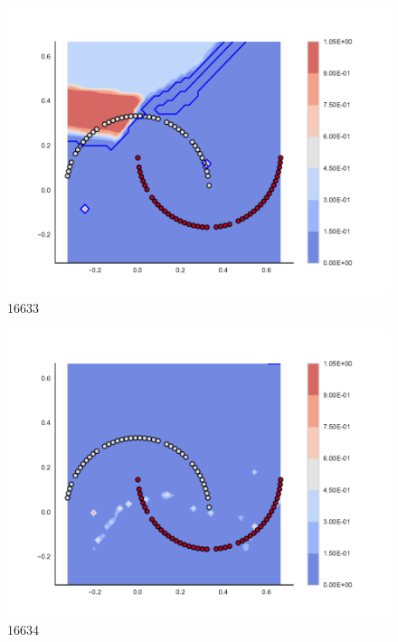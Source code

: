 \begin{subfigure}[b]{0.09\textwidth}
    \includegraphics[clip, trim=2.35cm 1.75cm 4.5cm 0cm,width=\textwidth]{img/convergence/16633.pdf}
    \caption{16633}
    \label{fig:convergence_16633}
\end{subfigure}
%
\begin{subfigure}[b]{0.09\textwidth}
    \includegraphics[clip, trim=2.35cm 1.75cm 4.5cm 0cm,width=\textwidth]{img/convergence/16634.pdf}
    \caption{16634}
    \label{fig:convergence_16634}
\end{subfigure}
%
